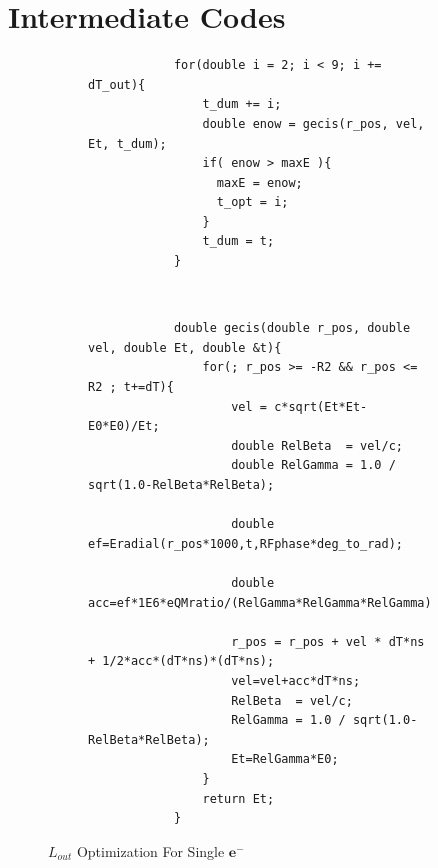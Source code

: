 \documentclass[a4paper,oneside,12pt]{report}
\numberwithin{equation}{chapter}
\begin{document}
\chapter{Intermediate Codes} \label{appendix:intermediate_codes}
\begin{figure}[H]
    \centering
    \captionsetup{justification=centering}
    \begin{subfigure}{\textwidth}
        \centering
        \begin{verbatim}
            for(double i = 2; i < 9; i += dT_out){
                t_dum += i;
                double enow = gecis(r_pos, vel, Et, t_dum);
                if( enow > maxE ){
                  maxE = enow;
                  t_opt = i;
                }
                t_dum = t;
            }
        \end{verbatim}
    \end{subfigure} 
    \\
    \begin{subfigure}{\textwidth}
        \centering
        \begin{verbatim}
            double gecis(double r_pos, double vel, double Et, double &t){
                for(; r_pos >= -R2 && r_pos <= R2 ; t+=dT){
                    vel = c*sqrt(Et*Et-E0*E0)/Et;
                    double RelBeta  = vel/c;
                    double RelGamma = 1.0 / sqrt(1.0-RelBeta*RelBeta);
                
                    double ef=Eradial(r_pos*1000,t,RFphase*deg_to_rad);
                
                    double acc=ef*1E6*eQMratio/(RelGamma*RelGamma*RelGamma); 
                
                    r_pos = r_pos + vel * dT*ns + 1/2*acc*(dT*ns)*(dT*ns);
                    vel=vel+acc*dT*ns;
                    RelBeta  = vel/c;
                    RelGamma = 1.0 / sqrt(1.0-RelBeta*RelBeta);
                    Et=RelGamma*E0; 
                }
                return Et;
            }
        \end{verbatim}
    \end{subfigure}
    \caption{$L_{out}$ Optimization For Single $\textbf{e}^-$}
    \label{fig:lout_opt_single_e}
\end{figure}
\end{document}
